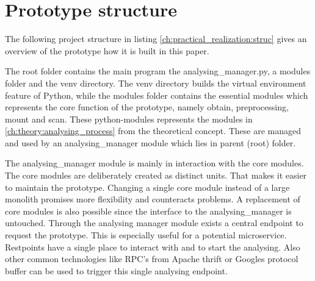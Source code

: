 \section{Prototype structure}
\label{ch:practical_realization:prot_struct}
The following project structure in listing \ref{ch:practical_realization:struc} gives an overview of the prototype how it is built in this paper.


The root folder contains the main program the analysing\_manager.py, a modules folder and the venv directory.
The venv directory builds the virtual environment feature of Python, while the modules folder contains the essential modules which represents the core function of the prototype, namely obtain, preprocessing, mount and scan. These python-modules represents the modules in \ref{ch:theory:analysing_process} from the theoretical concept. These are managed and used by an analysing\_manager module which lies in parent (root) folder. 

The analysing\_manager module is mainly in interaction with the core modules. The core modules are deliberately created as distinct units. That makes it easier to maintain the prototype. Changing a single core module instead of a large monolith promises more flexibility and counteracts problems. A replacement of core modules is also possible since the interface to the analysing\_manager is untouched.
Through the analysing manager module exists a central endpoint to request the prototype. This is especially useful for a potential microservice. Restpoints have a single place to interact with and to start the analysing. Also other common technologies like RPC's from Apache thrift or Googles protocol buffer can be used to trigger this single analysing endpoint. 

